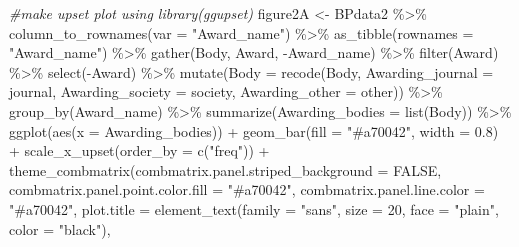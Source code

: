 \documentclass[
]{article}
\newenvironment{Shaded}{\begin{snugshade}}{\end{snugshade}}
\newcommand{\AttributeTok}[1]{\textcolor[rgb]{0.77,0.63,0.00}{#1}}
\newcommand{\CommentTok}[1]{\textcolor[rgb]{0.56,0.35,0.01}{\textit{#1}}}
\newcommand{\ConstantTok}[1]{\textcolor[rgb]{0.00,0.00,0.00}{#1}}
\newcommand{\DecValTok}[1]{\textcolor[rgb]{0.00,0.00,0.81}{#1}}
\newcommand{\FloatTok}[1]{\textcolor[rgb]{0.00,0.00,0.81}{#1}}
\newcommand{\FunctionTok}[1]{\textcolor[rgb]{0.00,0.00,0.00}{#1}}
\newcommand{\NormalTok}[1]{#1}
\newcommand{\OtherTok}[1]{\textcolor[rgb]{0.56,0.35,0.01}{#1}}
\newcommand{\SpecialCharTok}[1]{\textcolor[rgb]{0.00,0.00,0.00}{#1}}
\newcommand{\StringTok}[1]{\textcolor[rgb]{0.31,0.60,0.02}{#1}}
\begin{document}
\begin{Shaded}
\begin{Highlighting}[]
\CommentTok{\#make upset plot using library(ggupset)}
\NormalTok{figure2A }\OtherTok{\textless{}{-}}\NormalTok{ BPdata2 }\SpecialCharTok{\%\textgreater{}\%} 
  \FunctionTok{column\_to\_rownames}\NormalTok{(}\AttributeTok{var =} \StringTok{"Award\_name"}\NormalTok{) }\SpecialCharTok{\%\textgreater{}\%} 
  \FunctionTok{as\_tibble}\NormalTok{(}\AttributeTok{rownames =} \StringTok{"Award\_name"}\NormalTok{) }\SpecialCharTok{\%\textgreater{}\%}
  \FunctionTok{gather}\NormalTok{(Body, Award, }\SpecialCharTok{{-}}\NormalTok{Award\_name) }\SpecialCharTok{\%\textgreater{}\%} 
  \FunctionTok{filter}\NormalTok{(Award) }\SpecialCharTok{\%\textgreater{}\%}
  \FunctionTok{select}\NormalTok{(}\SpecialCharTok{{-}}\NormalTok{Award) }\SpecialCharTok{\%\textgreater{}\%}
  \FunctionTok{mutate}\NormalTok{(}\AttributeTok{Body =} \FunctionTok{recode}\NormalTok{(Body, }\StringTok{\textquotesingle{}Awarding\_journal\textquotesingle{}} \OtherTok{=} \StringTok{\textquotesingle{}journal\textquotesingle{}}\NormalTok{, }\StringTok{\textquotesingle{}Awarding\_society\textquotesingle{}} \OtherTok{=} \StringTok{\textquotesingle{}society\textquotesingle{}}\NormalTok{, }\StringTok{\textquotesingle{}Awarding\_other\textquotesingle{}} \OtherTok{=} \StringTok{\textquotesingle{}other\textquotesingle{}}\NormalTok{)) }\SpecialCharTok{\%\textgreater{}\%}
  \FunctionTok{group\_by}\NormalTok{(Award\_name) }\SpecialCharTok{\%\textgreater{}\%}
  \FunctionTok{summarize}\NormalTok{(}\AttributeTok{Awarding\_bodies =} \FunctionTok{list}\NormalTok{(Body)) }\SpecialCharTok{\%\textgreater{}\%}
  \FunctionTok{ggplot}\NormalTok{(}\FunctionTok{aes}\NormalTok{(}\AttributeTok{x =}\NormalTok{ Awarding\_bodies)) }\SpecialCharTok{+}
    \FunctionTok{geom\_bar}\NormalTok{(}\AttributeTok{fill =} \StringTok{"\#a70042"}\NormalTok{, }\AttributeTok{width =} \FloatTok{0.8}\NormalTok{) }\SpecialCharTok{+}
    \FunctionTok{scale\_x\_upset}\NormalTok{(}\AttributeTok{order\_by =} \FunctionTok{c}\NormalTok{(}\StringTok{"freq"}\NormalTok{)) }\SpecialCharTok{+}
    \FunctionTok{theme\_combmatrix}\NormalTok{(}\AttributeTok{combmatrix.panel.striped\_background =} \ConstantTok{FALSE}\NormalTok{,}
                    \AttributeTok{combmatrix.panel.point.color.fill =} \StringTok{"\#a70042"}\NormalTok{,}
                    \AttributeTok{combmatrix.panel.line.color =} \StringTok{"\#a70042"}\NormalTok{,}
                    \AttributeTok{plot.title =} \FunctionTok{element\_text}\NormalTok{(}\AttributeTok{family =} \StringTok{"sans"}\NormalTok{, }\AttributeTok{size =} \DecValTok{20}\NormalTok{, }\AttributeTok{face =} \StringTok{"plain"}\NormalTok{, }\AttributeTok{color =} \StringTok{"black"}\NormalTok{),}

\end{Highlighting}
\end{Shaded}
\end{document}
